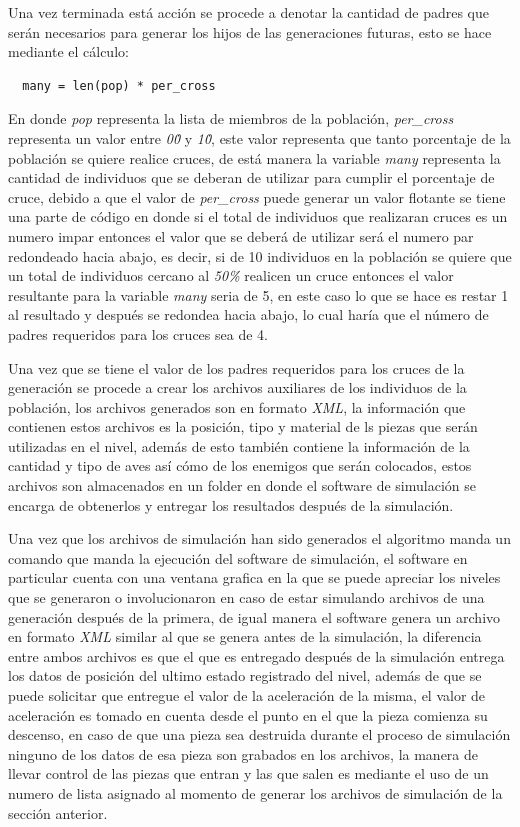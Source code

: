 Una vez terminada está acción se procede a denotar la cantidad de padres que
serán necesarios para generar los hijos de las generaciones futuras, esto se
hace mediante el cálculo:
\begin{verbatim}
  many = len(pop) * per_cross
\end{verbatim}
En donde \textit{pop} representa la lista de miembros de la población,
\textit{per\_cross} representa un valor entre \textit{0\.0} y \textit{1\.0}, este
valor representa que tanto porcentaje de la población se quiere realice cruces,
de está manera la variable \textit{many} representa la cantidad de individuos
que se deberan de utilizar para cumplir el porcentaje de cruce, debido a que el
valor de \textit{per\_cross} puede generar un valor flotante se tiene una parte
de código en donde si el total de individuos que realizaran cruces es un numero
impar entonces el valor que se deberá de utilizar será el numero par redondeado
hacia abajo, es decir, si de 10 individuos en la población se quiere que un
total de individuos cercano al \textit{50\%} realicen un cruce entonces el valor
resultante para la variable \textit{many} seria de 5, en este caso lo que se
hace es restar 1 al resultado y después se redondea hacia abajo, lo cual haría
que el número de padres requeridos para los cruces sea de 4.

Una vez que se tiene el valor de los padres requeridos para los cruces de la
generación se procede a crear los archivos auxiliares de los individuos de la
población, los archivos generados son en formato \textit{XML}, la información
que contienen estos archivos es la posición, tipo y material de ls piezas que
serán utilizadas en el nivel, además de esto también contiene la información de
la cantidad y tipo de aves así cómo de los enemigos que serán colocados, estos
archivos son almacenados en un folder en donde el software de simulación se
encarga de obtenerlos y entregar los resultados después de la simulación.

Una vez que los archivos de simulación han sido generados el algoritmo manda un
comando que manda la ejecución del software de simulación, el software en
particular cuenta con una ventana grafica en la que se puede apreciar los niveles
que se generaron o involucionaron en caso de estar simulando archivos de una
generación después de la primera, de igual manera el software genera un archivo
en formato \textit{XML} similar al que se genera antes de la simulación, la
diferencia entre ambos archivos es que el que es entregado después de la
simulación entrega los datos de posición del ultimo estado registrado del nivel,
además de que se puede solicitar que entregue el valor de la aceleración de la
misma, el valor de aceleración es tomado en cuenta desde el punto en el que la
pieza comienza su descenso, en caso de que una pieza sea destruida durante el
proceso de simulación ninguno de los datos de esa pieza son grabados en los
archivos, la manera de llevar control de las piezas que entran y las que salen
es mediante el uso de un numero de lista asignado al momento de generar los
archivos de simulación de la sección anterior.

